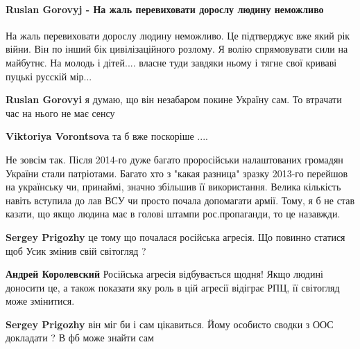  
 
 
 
 
\paragraph{Ruslan Gorovyj - На жаль перевиховати дорослу людину неможливо}
\label{sec:27_09_2021.fb.sentsov_oleg.1.usik.cmt.1.gorovyj_vospitanie}

\begin{itemize} %

На жаль перевиховати дорослу людину неможливо. Це підтверджує вже який рік
війни. Він по інший бік цивілізаційного розлому. Я волію спрямовувати сили на
майбутнє. На молодь і дітей.... власне туди завдяки ньому і тягне свої криваві
пуцькі русскій мір...

\begin{itemize} %
\textbf{Ruslan Gorovyi} я думаю, що він незабаром покине Україну сам. То втрачати час на нього не має сенсу

\textbf{Viktoriya Vorontsova} та б вже поскоріше ....


Не зовсім так. Після 2014-го дуже багато проросійськи налаштованих громадян
України стали патріотами. Багато хто з "какая разница" зразку 2013-го перейшов
на українську чи, принаймі, значно збільшив її використання. Велика кількість
навіть вступила до лав ВСУ чи просто почала допомагати армії. Тому, я б не став
казати, що якщо людина має в голові штампи рос.пропаганди, то це назавжди.

\textbf{Sergey Prigozhy} це тому що почалася російська агресія. Що повинно статися щоб Усик змінив свій світогляд ?

\textbf{Андрей Королевский} Російська агресія відбувається щодня! Якщо людині доносити це, а також показати яку роль в цій агресії відіграє РПЦ, її світогляд може змінитися.

\textbf{Sergey Prigozhy} він міг би і сам цікавиться. Йому особисто сводки з ООС докладати ? В фб може знайти сам


\end{itemize}
\end{itemize}
